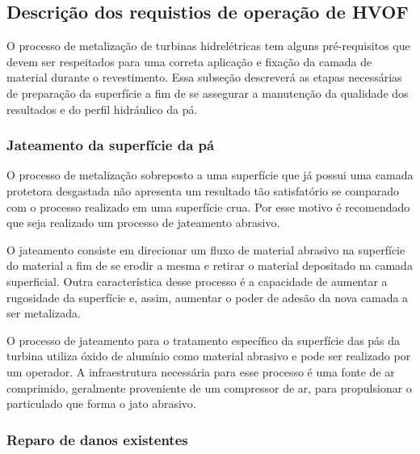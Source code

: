 \subsection{Descrição dos requistios de operação de HVOF}

O processo de metalização de turbinas hidrelétricas tem alguns pré-requisitos
que devem ser respeitados para uma correta aplicação e fixação da camada de
material durante o revestimento. Essa subseção descreverá as etapas necessárias
de preparação da superfície a fim de se assegurar a manutenção da qualidade dos resultados e do
perfil hidráulico da pá. 

\subsubsection{Jateamento da superfície da pá}

O processo de metalização sobreposto a uma superfície que já possui uma camada
protetora desgastada não apresenta um resultado tão satisfatório se comparado
com o processo realizado em uma superfície crua. Por esse motivo é recomendado
que seja realizado um processo de jateamento abrasivo. 

O jateamento consiste em direcionar um fluxo de material abrasivo na superfície
do material a fim de se erodir a mesma e retirar o material depositado na camada
superficial. Outra característica desse processo é a capacidade de aumentar a
rugosidade da superfície e, assim, aumentar o poder de adesão da nova camada a
ser metalizada.  

O processo de jateamento para o tratamento específico da superfície das pás da
turbina utiliza óxido de alumínio como material abrasivo e pode ser realizado
por um operador. A infraestrutura necessária para esse processo é uma fonte de
ar comprimido, geralmente proveniente de um compressor de ar, para propulsionar
o particulado que forma o jato abrasivo. %

\subsubsection{Reparo de danos existentes}

